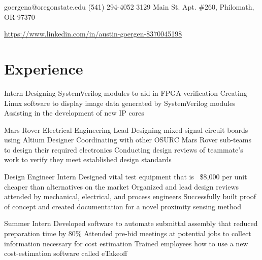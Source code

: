 \documentclass{my_cv}
\begin{document}

\contact
{goergena@oregonstate.edu}
{(541) 294-4052}
{3129 Main St. Apt. \#260, Philomath, OR 97370}

\vspace{-0.5em}

\begin{center}
\href{https://www.linkedin.com/in/austin-goergen-8370045198}{https://www.linkedin.com/in/austin-goergen-8370045198}
\end{center}

\section{Experience}

\vspace{-0.75em}
Intern
\workitems
    {Designing SystemVerilog modules to aid in FPGA verification}
    {Creating Linux software to display image data generated by SystemVerilog modules}
    {Assisting in the development of new IP cores}

\vspace{-0.75em}
Mars Rover Electrical Engineering Lead
\workitems
    {Designing mixed-signal circuit boards using Altium Designer}
    {Coordinating with other OSURC Mars Rover sub-teams to design their required electronics}
    {Conducting design reviews of teammate's work to verify they meet established design standards}

\vspace{-0.75em}
Design Engineer Intern
\workitems
    {Designed vital test equipment that is ~\$8,000 per unit cheaper than alternatives on the market}
    {Organized and lead design reviews attended by mechanical, electrical, and process engineers}
    {Successfully built proof of concept and created documentation for a novel proximity sensing method}

\vspace{-0.75em}
Summer Intern
\workitems
    {Developed software to automate submittal assembly that reduced preparation time by 80\%}
    {Attended pre-bid meetings at potential jobs to collect information necessary for cost estimation}
    {Trained employees how to use a new cost-estimation software called eTakeoff}
\end{document}
